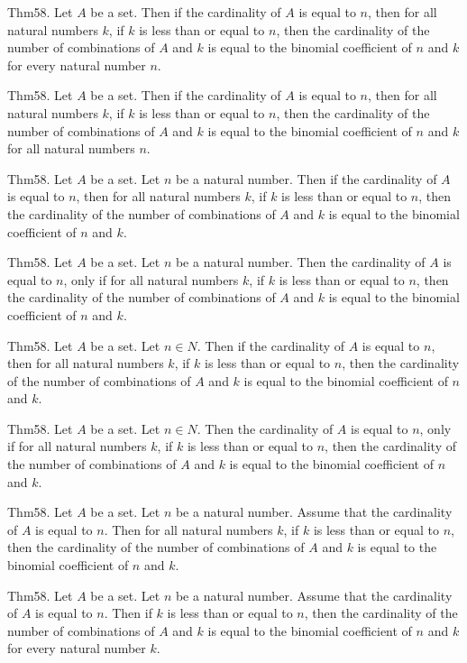 \documentclass{article}
\begin{document}
Thm58. Let $A$ be a set. Then if the cardinality of $A$ is equal to $n$, then for all natural numbers $k$, if $k$ is less than or equal to $n$, then the cardinality of the number of combinations of $A$ and $k$ is equal to the binomial coefficient of $n$ and $k$ for every natural number $n$.

Thm58. Let $A$ be a set. Then if the cardinality of $A$ is equal to $n$, then for all natural numbers $k$, if $k$ is less than or equal to $n$, then the cardinality of the number of combinations of $A$ and $k$ is equal to the binomial coefficient of $n$ and $k$ for all natural numbers $n$.

Thm58. Let $A$ be a set. Let $n$ be a natural number. Then if the cardinality of $A$ is equal to $n$, then for all natural numbers $k$, if $k$ is less than or equal to $n$, then the cardinality of the number of combinations of $A$ and $k$ is equal to the binomial coefficient of $n$ and $k$.

Thm58. Let $A$ be a set. Let $n$ be a natural number. Then the cardinality of $A$ is equal to $n$, only if for all natural numbers $k$, if $k$ is less than or equal to $n$, then the cardinality of the number of combinations of $A$ and $k$ is equal to the binomial coefficient of $n$ and $k$.

Thm58. Let $A$ be a set. Let $n \in N$. Then if the cardinality of $A$ is equal to $n$, then for all natural numbers $k$, if $k$ is less than or equal to $n$, then the cardinality of the number of combinations of $A$ and $k$ is equal to the binomial coefficient of $n$ and $k$.

Thm58. Let $A$ be a set. Let $n \in N$. Then the cardinality of $A$ is equal to $n$, only if for all natural numbers $k$, if $k$ is less than or equal to $n$, then the cardinality of the number of combinations of $A$ and $k$ is equal to the binomial coefficient of $n$ and $k$.

Thm58. Let $A$ be a set. Let $n$ be a natural number. Assume that the cardinality of $A$ is equal to $n$. Then for all natural numbers $k$, if $k$ is less than or equal to $n$, then the cardinality of the number of combinations of $A$ and $k$ is equal to the binomial coefficient of $n$ and $k$.

Thm58. Let $A$ be a set. Let $n$ be a natural number. Assume that the cardinality of $A$ is equal to $n$. Then if $k$ is less than or equal to $n$, then the cardinality of the number of combinations of $A$ and $k$ is equal to the binomial coefficient of $n$ and $k$ for every natural number $k$.
\end{document}
